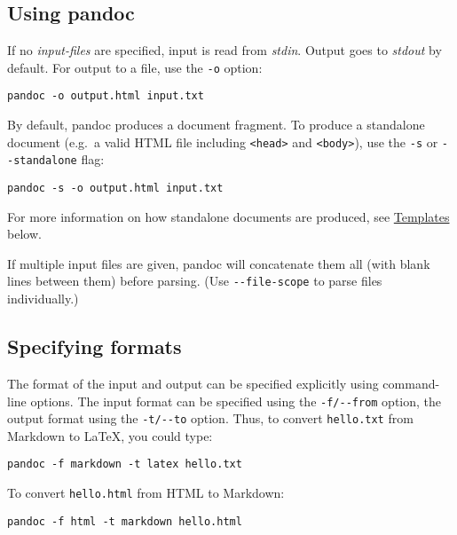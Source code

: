 \hypertarget{using-pandoc}{%
\subsection{Using pandoc}\label{using-pandoc}}

If no \emph{input-files} are specified, input is read from \emph{stdin}.
Output goes to \emph{stdout} by default. For output to a file, use the
\texttt{-o} option:

\begin{verbatim}
pandoc -o output.html input.txt
\end{verbatim}

By default, pandoc produces a document fragment. To produce a standalone
document (e.g.~a valid HTML file including
\texttt{\textless{}head\textgreater{}} and
\texttt{\textless{}body\textgreater{}}), use the \texttt{-s} or
\texttt{-\/-standalone} flag:

\begin{verbatim}
pandoc -s -o output.html input.txt
\end{verbatim}

For more information on how standalone documents are produced, see
\protect\hyperlink{templates}{Templates} below.

If multiple input files are given, pandoc will concatenate them all
(with blank lines between them) before parsing. (Use
\texttt{-\/-file-scope} to parse files individually.)

\hypertarget{specifying-formats}{%
\subsection{Specifying formats}\label{specifying-formats}}

The format of the input and output can be specified explicitly using
command-line options. The input format can be specified using the
\texttt{-f/-\/-from} option, the output format using the
\texttt{-t/-\/-to} option. Thus, to convert \texttt{hello.txt} from
Markdown to LaTeX, you could type:

\begin{verbatim}
pandoc -f markdown -t latex hello.txt
\end{verbatim}

To convert \texttt{hello.html} from HTML to Markdown:

\begin{verbatim}
pandoc -f html -t markdown hello.html
\end{verbatim}

